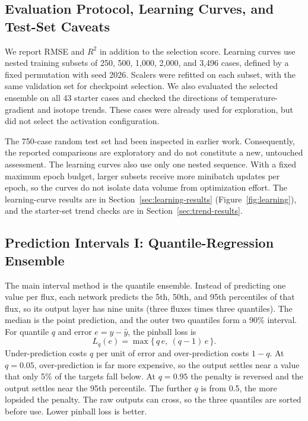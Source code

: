 \documentclass[12pt,letterpaper]{article}
\begin{document}
\subsection{Evaluation Protocol, Learning Curves, and Test-Set Caveats}
\label{sec:eval-methods}

We report RMSE and $R^2$ in addition to the selection
score. Learning curves use nested training subsets of 250, 500, 1,000, 2,000,
and 3,496 cases, defined by a fixed permutation with seed 2026. Scalers were
refitted on each subset, with the same validation set for checkpoint selection.
We also evaluated the selected ensemble on all 43 starter cases and checked
the directions of temperature-gradient and isotope trends. These cases were
already used for exploration, but did not select the activation configuration.

The 750-case random test set had been inspected in earlier work. Consequently,
the reported comparisons are exploratory and do not constitute a new,
untouched assessment. The learning curves also use only one nested sequence.
With a fixed maximum epoch budget, larger subsets receive more minibatch updates per
epoch, so the curves do not isolate data volume from optimization effort.
The learning-curve results are in Section~\ref{sec:learning-results}
(Figure~\ref{fig:learning}), and the starter-set trend checks are in
Section~\ref{sec:trend-results}.

\subsection{Prediction Intervals I: Quantile-Regression Ensemble}
\label{sec:interval-methods}

The main interval method is the quantile ensemble. Instead of
predicting one value per flux, each
network predicts the 5th, 50th, and 95th percentiles of that flux, so its
output layer has nine units (three fluxes times three quantiles). The median is
the point prediction, and the outer two quantiles form a 90\% interval. For
quantile $q$ and error $e = y - \hat{y}$, the pinball loss is
\begin{equation}
  L_q(e) = \max\{\,q\,e,\ (q-1)\,e\,\}.
  \label{eq:pinball}
\end{equation}
Under-prediction costs $q$ per unit of error and over-prediction costs $1-q$.
At $q = 0.05$, over-prediction is far more expensive, so the output settles
near a value that only 5\% of the targets fall below. At $q = 0.95$ the
penalty is reversed and the output settles near the 95th percentile. The
further $q$ is from 0.5, the more lopsided the penalty. The raw outputs can
cross, so the three quantiles are sorted before use. Lower pinball loss is
better.
\end{document}

